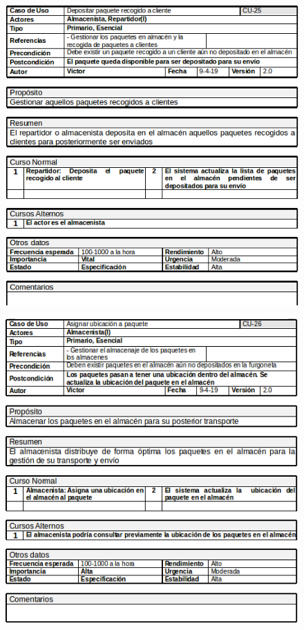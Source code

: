 \begin{figure}[H]
	\centering
	\includegraphics[width=16cm]{25}
\end{figure}
\begin{figure}[H]
	\centering
	\includegraphics[width=16cm]{26}
\end{figure}

